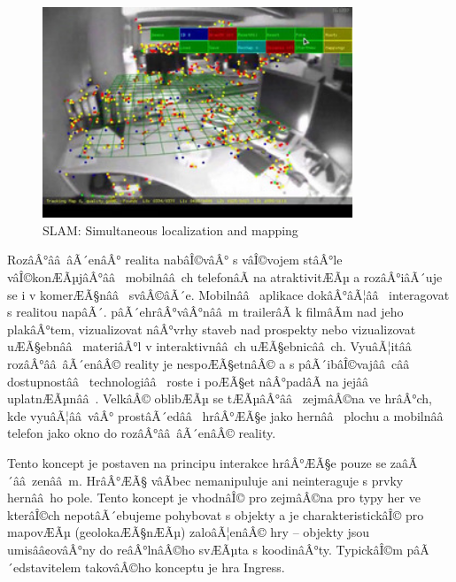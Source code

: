 \documentclass[twoside,12pt]{article}
\begin{document}
\begin{figure}[H]
    \includegraphics[width=350px, center]{images/slam.jpg}
    \caption{SLAM: Simultaneous localization and mapping}
    \label{slam}
\end{figure}


%
%

RozâÂ°ââ âÃ´enâÂ° realita nabâÎ©vâÂ° s vâÎ©vojem stâÂ°le vâÎ©konÆÃµjâÂ°ââ  mobilnââ ch telefonâÃ na atraktivitÆÃµ a rozâÂ°iâÃ´uje se i v komerÆÃ§nââ  svâÂ©âÃ´e. Mobilnââ  aplikace dokâÂ°âÃ¦ââ  interagovat s realitou napâÃ´. pâÃ´ehrâÂ°vâÂ°nââ m trailerâÃ k filmâÃm nad jeho plakâÂ°tem, vizualizovat nâÂ°vrhy staveb nad prospekty nebo vizualizovat uÆÃ§ebnââ  materiâÂ°l v interaktivnââ ch uÆÃ§ebnicââ ch. VyuâÃ¦itââ  rozâÂ°ââ âÃ´enâÂ© reality je nespoÆÃ§etnâÂ© a s pâÃ´ibâÎ©vajââ cââ  dostupnostââ  technologiââ  roste i poÆÃ§et nâÂ°padâÃ na jejââ  uplatnÆÃµnââ . VelkâÂ© oblibÆÃµ se tÆÃµâÂ°ââ  zejmâÂ©na ve hrâÂ°ch, kde vyuâÃ¦ââ vâÂ° prostâÃ´edââ  hrâÂ°ÆÃ§e jako hernââ  plochu a mobilnââ  telefon jako okno do rozâÂ°ââ âÃ´enâÂ© reality.

Tento koncept je postaven na principu interakce hrâÂ°ÆÃ§e pouze se zaâÃ´ââ zenââ m. HrâÂ°ÆÃ§ vâÃbec nemanipuluje ani neinteraguje s prvky hernââ ho pole. Tento koncept je vhodnâÎ© pro zejmâÂ©na pro typy her ve kterâÎ©ch nepotâÃ´ebujeme pohybovat s objekty a je charakteristickâÎ© pro mapovÆÃµ (geolokaÆÃ§nÆÃµ) zaloâÃ¦enâÂ© hry -- objekty jsou umisââ¢ovâÂ°ny do reâÂ°lnâÂ©ho svÆÃµta s koodinâÂ°ty. TypickâÎ©m pâÃ´edstavitelem takovâÂ©ho konceptu je hra Ingress.
\end{document}
